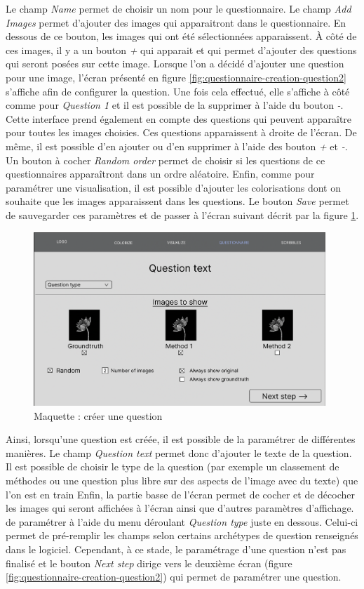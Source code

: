 \documentclass{article}
\begin{document}
Le champ \textit{Name} permet de choisir un nom pour le questionnaire. Le champ \textit{Add Images} permet d'ajouter
des images qui apparaitront dans le questionnaire. En dessous de ce bouton, les images qui ont été sélectionnées apparaissent.
À côté de ces images, il y a un bouton \textit{+} qui apparait et qui permet d'ajouter des questions qui seront posées sur cette image.
Lorsque l'on a décidé d'ajouter une question pour une image, l'écran présenté en figure \ref{fig:questionnaire-creation-question2} s'affiche afin de configurer la question. Une fois cela effectué,
elle s'affiche à côté comme pour \textit{Question 1} et il est possible de la supprimer à l'aide
du bouton \textit{-}.
Cette interface prend également en compte des questions qui peuvent apparaître pour toutes les images choisies. Ces questions apparaissent à droite de l'écran.
De même, il est possible d'en ajouter ou d'en supprimer à l'aide des bouton \textit{+} et \textit{-}.
Un bouton à cocher \textit{Random order} permet de choisir si les questions de ce questionnaires apparaîtront dans un ordre aléatoire. Enfin, comme pour paramétrer une visualisation,
il est possible d'ajouter les colorisations dont on souhaite que les images apparaissent dans les questions. 
Le bouton \textit{Save} permet de sauvegarder ces paramètres et de passer à l'écran suivant décrit par la figure \ref{fig:questionnaire-creation-question1}.

\begin{figure}[!ht]
    \centering
    \includegraphics[width=11cm]{questionnaire-creation-question1.png}
    \caption{Maquette : créer une question}
    \label{fig:questionnaire-creation-question1}
\end{figure}

Ainsi, lorsqu'une question est créée, il est possible de la paramétrer de différentes manières.
Le champ \textit{Question text} permet donc d'ajouter le texte de la question. Il est possible de choisir le type de la question (par exemple un classement 
de méthodes ou une question plus libre sur des aspects de l'image avec du texte) que l'on est en train
Enfin, la partie basse de l'écran permet de cocher et de décocher les images qui seront affichées à l'écran ainsi que d'autres paramètres d'affichage.
de paramétrer à l'aide du menu déroulant \textit{Question type} juste en dessous. Celui-ci permet de pré-remplir les champs selon certains archétypes de question renseignés dans le logiciel.
Cependant, à ce stade, le paramétrage d'une question n'est pas finalisé et le bouton \textit{Next step} dirige vers le deuxième écran (figure \ref{fig:questionnaire-creation-question2}) qui permet de paramétrer une question.
\end{document}
